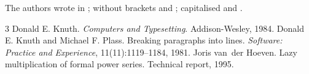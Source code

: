 \documentclass{article}
\begin{document}
The authors \citeauthor{plass81} wrote in \citeyear{plass81}
\citeyearpar{plass81}; without brackets \citealt{knuth84} and
\citealp{knuth84,plass81}; capitalised  and
.

\begin{thebibliography}{3}
 Donald E. Knuth. \emph{Computers and Typesetting}. Addison-Wesley, 1984.
 Donald E. Knuth and Michael F. Plass.
  Breaking paragraphs into lines. \emph{Software: Practice and Experience},
  11(11):1119--1184, 1981.
 Joris van~der Hoeven. Lazy
  multiplication of formal power series. Technical report, 1995.
\end{thebibliography}
\end{document}
